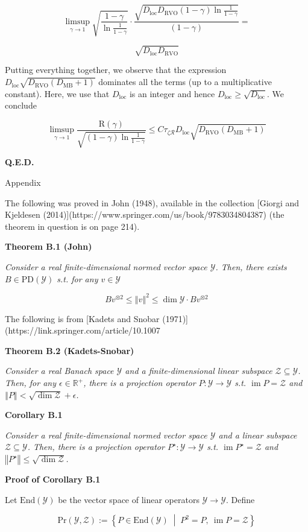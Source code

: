 \documentclass[a4paper]{article}
\newcommand{\Co}[1]{}
\newcommand{\ACM}[2]{\left\{#1\;\middle\vert\;#2\right\}}
\newcommand{\Reals}{\mathbb{R}}
\newcommand{\PD}{\mathrm{PD}}
\newcommand{\End}{\mathrm{End}}
\DeclareMathOperator{\Img}{im}
\newcommand{\Norm}[1]{\left\Vert #1 \right\Vert}
\newcommand{\Y}{\mathcal{Y}}
\newcommand{\Z}{\mathcal{Z}}
\newcommand{\R}{\mathcal{R}}
\newcommand{\DRVO}{D_{\mathrm{RVO}}}
\newcommand{\DMB}{D_{\mathrm{MB}}}
\newcommand{\DL}{D_{\mathrm{loc}}}
\newcommand{\Reg}{\mathrm{R}}
\begin{document}
$$\limsup_{\gamma\rightarrow1}{\sqrt{\frac{1-\gamma}{\ln{\frac{1}{1-\gamma}}}}\cdot\frac{\sqrt{\DL\DRVO(1-\gamma)\ln\frac{1}{1-\gamma}}}{(1-\gamma)}}=$$

$$\sqrt{\DL\DRVO}$$

Putting everything together, we observe that the expression $\DL\sqrt{\DRVO(\DMB+1)}$ dominates all the terms (up to a multiplicative constant). Here, we use that $\DL$ is an integer and hence $\DL\geq\sqrt{\DL}$. We conclude

$$\limsup_{\gamma\rightarrow1}{\frac{\Reg(\gamma)}{\sqrt{(1-\gamma)\ln{\frac{1}{1-\gamma}}}}}\leq C\tau_{\zeta\R}\DL\sqrt{\DRVO(\DMB+1)}$$

\textbf{Q.E.D.}\Co{b}

\begin{Huge}Appendix\end{Huge}

The following was proved in John (1948), available in the collection [Giorgi and Kjeldesen (2014)](https://www.springer.com/us/book/9783034804387) (the theorem in question is on page 214). 

\textbf{Theorem B.1 (John)}\Co{b}

\textit{Consider a real finite-dimensional normed vector space $\Y$. Then, there exists $B\in\PD(\Y)$ s.t. for any $v\in\Y$}\Co{i}

$$Bv^{\otimes2}\leq\Norm{v}^2\leq\dim{\Y}\cdot Bv^{\otimes2}$$

The following is from [Kadets and Snobar (1971)](https://link.springer.com/article/10.1007%

\textbf{Theorem B.2 (Kadets-Snobar)}\Co{b}

\textit{Consider a real Banach space $\Y$ and a finite-dimensional linear subspace $\Z\subseteq\Y$. Then, for any $\epsilon\in\Reals^+$, there is a projection operator $P:\Y\rightarrow\Y$ s.t. $\Img{P}=\Z$ and $\Norm{P}<\sqrt{\dim{\Z}}+\epsilon$.}\Co{i}

\textbf{Corollary B.1}\Co{b}

\textit{Consider a real finite-dimensional normed vector space $\Y$ and a linear subspace $\Z\subseteq\Y$. Then, there is a projection operator $P^\star:\Y\rightarrow\Y$ s.t. $\Img{P^\star}=\Z$ and $\Norm{P^\star}\leq\sqrt{\dim{\Z}}$.}\Co{i}

\textbf{Proof of Corollary B.1}\Co{b}

Let $\End(\Y)$ be the vector space of linear operators $\Y\rightarrow\Y$. Define

$$\mathrm{Pr}(\Y,\Z):=\ACM{P\in\End(\Y)}{P^2=P,\ \Img{P}=\Z}$$
\end{document}
